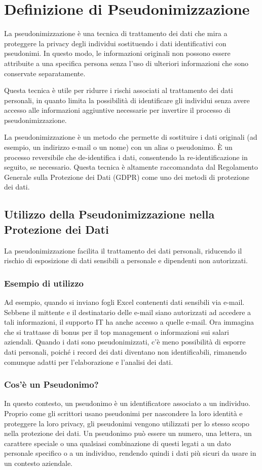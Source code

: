 \chapter{Definizione di Pseudonimizzazione}


La pseudonimizzazione è una tecnica di trattamento dei dati che mira a proteggere la privacy degli individui sostituendo i dati identificativi con pseudonimi. In questo modo, le informazioni originali non possono essere attribuite a una specifica persona senza l'uso di ulteriori informazioni che sono conservate separatamente.

Questa tecnica è utile per ridurre i rischi associati al trattamento dei dati personali, in quanto limita la possibilità di identificare gli individui senza avere accesso alle informazioni aggiuntive necessarie per invertire il processo di pseudonimizzazione.

La pseudonimizzazione è un metodo che permette di sostituire i dati originali (ad esempio, un indirizzo e-mail o un nome) con un alias o pseudonimo. È un processo reversibile che de-identifica i dati, consentendo la re-identificazione in seguito, se necessario. Questa tecnica è altamente raccomandata dal Regolamento Generale sulla Protezione dei Dati (GDPR) come uno dei metodi di protezione dei dati.

\section{Utilizzo della Pseudonimizzazione nella Protezione dei Dati}
La pseudonimizzazione facilita il trattamento dei dati personali, riducendo il rischio di esposizione di dati sensibili a personale e dipendenti non autorizzati.

\subsection{Esempio di utilizzo}
Ad esempio, quando si inviano fogli Excel contenenti dati sensibili via e-mail. Sebbene il mittente e il destinatario delle e-mail siano autorizzati ad accedere a tali informazioni, il supporto IT ha anche accesso a quelle e-mail. Ora immagina che si trattasse di bonus per il top management o informazioni sui salari aziendali. Quando i dati sono pseudonimizzati, c'è meno possibilità di esporre dati personali, poiché i record dei dati diventano non identificabili, rimanendo comunque adatti per l'elaborazione e l'analisi dei dati.

\subsection{Cos'è un Pseudonimo?}
In questo contesto, un pseudonimo è un identificatore associato a un individuo. Proprio come gli scrittori usano pseudonimi per nascondere la loro identità e proteggere la loro privacy, gli pseudonimi vengono utilizzati per lo stesso scopo nella protezione dei dati. Un pseudonimo può essere un numero, una lettera, un carattere speciale o una qualsiasi combinazione di questi legati a un dato personale specifico o a un individuo, rendendo quindi i dati più sicuri da usare in un contesto aziendale.